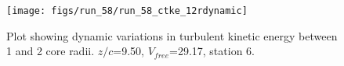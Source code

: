 \begin{figure}[H]
\centering
\texttt{[image: figs/run\_58/run\_58\_ctke\_12rdynamic]}
\caption{Plot showing dynamic variations in turbulent kinetic energy between 1 and 2 core radii. $z/c$=9.50, $V_{free}$=29.17, station 6.}
\end{figure}


